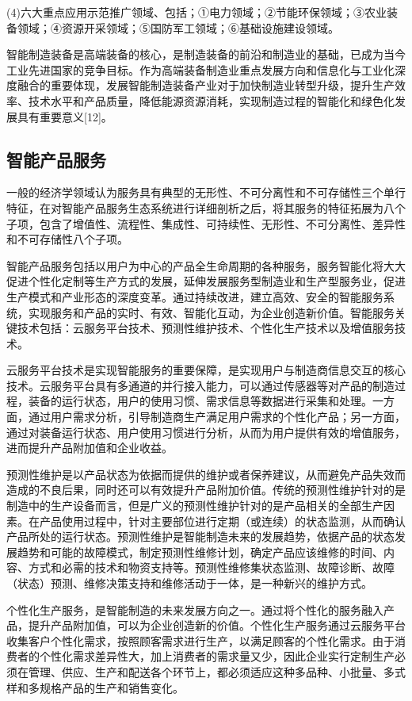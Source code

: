 \documentclass[lang=cn,12pt,bibtex,newtx,twoside,margintrue,citestyle=gb7714-2015, bibstyle=gb7714-2015]{elegantbook}
\begin{document}
(4)六大重点应用示范推广领域、包括；①电力领域；②节能环保领域；③农业装备领域；④资源开采领域；⑤国防军工领域；⑥基础设施建设领域。


智能制造装备是高端装备的核心，是制造装备的前沿和制造业的基础，已成为当今工业先进国家的竞争目标。作为高端装备制造业重点发展方向和信息化与工业化深度融合的重要体现，发展智能制造装备产业对于加快制造业转型升级，提升生产效率、技术水平和产品质量，降低能源资源消耗，实现制造过程的智能化和绿色化发展具有重要意义[12]。

\subsection{智能产品服务}
\label{sec:orga93e423}
一般的经济学领域认为服务具有典型的无形性、不可分离性和不可存储性三个单行特征，在对智能产品服务生态系统进行详细剖析之后，将其服务的特征拓展为八个子项，包含了增值性、流程性、集成性、可持续性、无形性、不可分离性、差异性和不可存储性八个子项\cite{郑茂宽2018}。

智能产品服务包括以用户为中心的产品全生命周期的各种服务，服务智能化将大大促进个性化定制等生产方式的发展，延伸发展服务型制造业和生产型服务业，促进生产模式和产业形态的深度变革。通过持续改进，建立高效、安全的智能服务系统，实现服务和产品的实时、有效、智能化互动，为企业创造新价值。智能服务关键技术包括：云服务平台技术、预测性维护技术、个性化生产技术以及增值服务技术。

云服务平台技术是实现智能服务的重要保障，是实现用户与制造商信息交互的核心技术。云服务平台具有多通道的并行接入能力，可以通过传感器等对产品的制造过程，装备的运行状态，用户的使用习惯、需求信息等数据进行采集和处理。一方面，通过用户需求分析，引导制造商生产满足用户需求的个性化产品；另一方面，通过对装备运行状态、用户使用习惯进行分析，从而为用户提供有效的增值服务，进而提升产品附加值和企业收益。

预测性维护是以产品状态为依据而提供的维护或者保养建议，从而避免产品失效而造成的不良后果，同时还可以有效提升产品附加价值。传统的预测性维护针对的是制造中的生产设备而言，但是广义的预测性维护针对的是产品相关的全部生产因素。在产品使用过程中，针对主要部位进行定期（或连续）的状态监测，从而确认产品所处的运行状态。预测性维护是智能制造未来的发展趋势，依据产品的状态发展趋势和可能的故障模式，制定预测性维修计划，确定产品应该维修的时间、内容、方式和必需的技术和物资支持等。预测性维修集状态监测、故障诊断、故障（状态）预测、维修决策支持和维修活动于一体，是一种新兴的维护方式。

个性化生产服务，是智能制造的未来发展方向之一。通过将个性化的服务融入产品，提升产品附加值，可以为企业创造新的价值。个性化生产服务通过云服务平台收集客户个性化需求，按照顾客需求进行生产，以满足顾客的个性化需求。由于消费者的个性化需求差异性大，加上消费者的需求量又少，因此企业实行定制生产必须在管理、供应、生产和配送各个环节上，都必须适应这种多品种、小批量、多式样和多规格产品的生产和销售变化。
\end{document}

